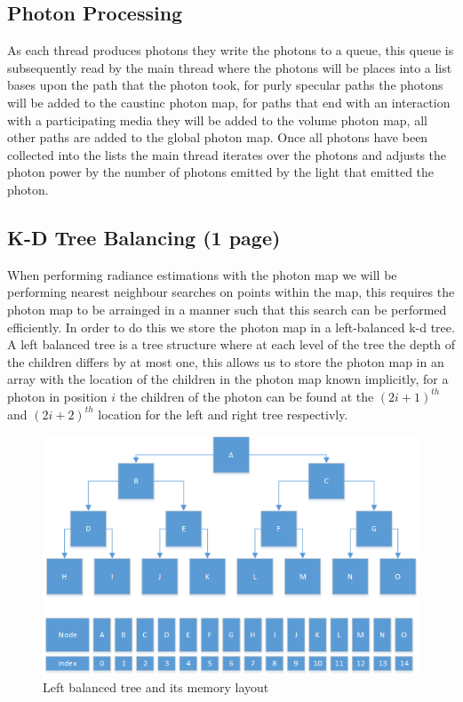 \subsection{Photon Processing}
As each thread produces photons they write the photons to a queue, this queue is subsequently read by the main thread where
the photons will be places into a list bases upon the path that the photon took, for purly specular paths the photons
will be added to the caustinc photon map, for paths that end with an interaction with a participating media they will be
added to the volume photon map, all other paths are added to the global photon map. Once all photons have been collected
into the lists the main thread iterates over the photons and adjusts the photon power by the number of photons emitted by
the light that emitted the photon. 

\subsection{K-D Tree Balancing (1 page)}
When performing radiance estimations with the photon map we will be performing nearest neighbour searches on points within
the map, this requires the photon map to be arrainged in a manner such that this search can be performed efficiently.
In order to do this we store the photon map in a left-balanced k-d tree. A left balanced tree is a tree structure where
at each level of the tree the depth of the children differs by at most one, 
this allows us to store the photon map in an array with the location of the children in the photon map known implicitly,
for a photon in position $i$ the children of the photon can be found at the $(2i + 1)^{th}$ and $(2i + 2)^{th}$
location for the left and right tree respectivly.


\begin{figure}
\centering
\includegraphics[scale=0.75]{./implementation/left-balanced-tree.png}
\caption{Left balanced tree and its memory layout}
\end{figure}

